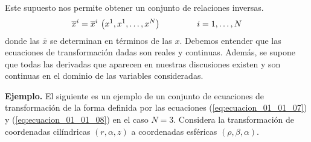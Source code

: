 \documentclass[hidelinks,12pt]{article}
\begin{document}
Este supuesto nos permite obtener un conjunto de relaciones inversas.
\begin{align}
\overline{x}^{i} = \overline{x}^{i} \,  \left( x^{1}, x^{1}, \ldots, x^{N} \right) \hspace{1.5cm} i = 1, \ldots, N
\label{eq:ecuacion_01_01_08}
\end{align}
donde las $\overline{x}$ se determinan en términos de las $x$. Debemos entender que las ecuaciones de transformación dadas son reales y continuas. Además, se supone que todas las derivadas que aparecen en nuestras discusiones existen y son continuas en el dominio de las variables consideradas.
\par
\noindent
\textbf{Ejemplo. } El siguiente es un ejemplo de un conjunto de ecuaciones de transformación de la forma definida por las ecuaciones (\ref{eq:ecuacion_01_01_07}) y (\ref{eq:ecuacion_01_01_08}) en el caso $N = 3$. Considera la transformación de coordenadas cilíndricas $(r, \alpha, z)$ a coordenadas esféricas $(\rho, \beta, \alpha)$. 
\end{document}
